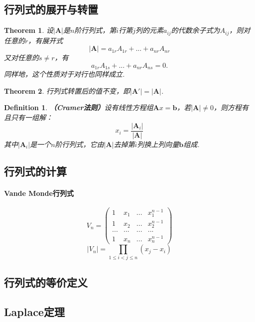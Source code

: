\documentclass[9pt]{ctexart}
\newtheorem{definition}{Definition}[section]
\newtheorem{theorem}{Theorem}[section]
\begin{document}
\subsection{行列式的展开与转置}
\begin{theorem}
    设$|\bm{A}|$是$n$阶行列式，第$i$行第$j$列的元素$a_{ij}$的代数余子式为$A_{ij}$，则对任意的$r$，有展开式
    \[|\bm{A}|=a_{1r}A_{1r}+...+a_{nr}A_{nr}\]
    又对任意的$s\neq r$，有
    \[a_{1r}A_{1s}+...+a_{nr}A_{ns}=0.\]
    同样地，这个性质对于对行也同样成立.
\end{theorem}
\begin{theorem}
    行列式转置后的值不变，即$|\bm{A}'|=|\bm{A}|$.
\end{theorem}
\begin{definition}
    \textbf{（Cramer法则）}设有线性方程组$\bm{A}x=\bm{b}$，若$|\bm{A}|\neq 0$，则方程有且只有一组解：
    \[x_i=\frac{|\bm{A}_i|}{|\bm{A}|}\]
    其中$|\bm{A}_i|$是一个$n$阶行列式，它由$|\bm{A}|$去掉第$i$列换上列向量$\bm{b}$组成.
\end{definition}
\subsection{行列式的计算}
\paragraph{Vande Monde行列式}
\begin{equation*}
    V_n=
    \left(
    \begin{matrix}
        1&x_1&...&x_1^{n-1}\\
        1&x_2&...&x_2^{n-1}\\
        ...&...&...&...\\
        1&x_n&...&x_n^{n-1}
    \end{matrix}
    \right)
\end{equation*}
\[|V_n|=\prod_{1\leq i< j\leq n}(x_j-x_i)\]
\subsection{行列式的等价定义}

\subsection{Laplace定理}
\end{document}
